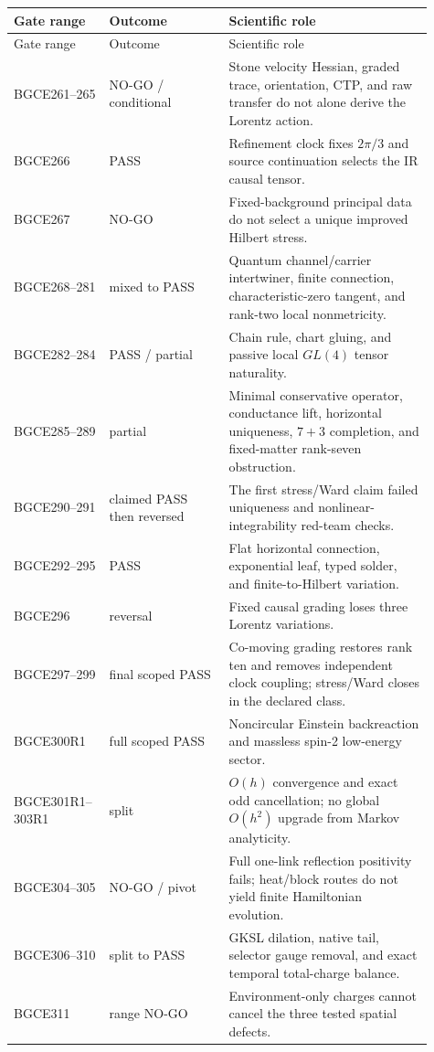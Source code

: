 \documentclass[11pt]{article}
\theoremstyle{definition}
\theoremstyle{remark}
\begin{document}
\begin{longtable}{>{\raggedright\arraybackslash}p{0.18\linewidth} >{\raggedright\arraybackslash}p{0.27\linewidth} >{\raggedright\arraybackslash}p{0.46\linewidth}}
\toprule
Gate range & Outcome & Scientific role \\
\midrule
\endfirsthead
\toprule
Gate range & Outcome & Scientific role \\
\midrule
\endhead
BGCE261--265 & NO-GO / conditional & Stone velocity Hessian, graded trace, orientation, CTP, and raw transfer do not alone derive the Lorentz action. \\
BGCE266 & PASS & Refinement clock fixes $2\pi/3$ and source continuation selects the IR causal tensor. \\
BGCE267 & NO-GO & Fixed-background principal data do not select a unique improved Hilbert stress. \\
BGCE268--281 & mixed to PASS & Quantum channel/carrier intertwiner, finite connection, characteristic-zero tangent, and rank-two local nonmetricity. \\
BGCE282--284 & PASS / partial & Chain rule, chart gluing, and passive local $GL(4)$ tensor naturality. \\
BGCE285--289 & partial & Minimal conservative operator, conductance lift, horizontal uniqueness, $7+3$ completion, and fixed-matter rank-seven obstruction. \\
BGCE290--291 & claimed PASS then reversed & The first stress/Ward claim failed uniqueness and nonlinear-integrability red-team checks. \\
BGCE292--295 & PASS & Flat horizontal connection, exponential leaf, typed solder, and finite-to-Hilbert variation. \\
BGCE296 & reversal & Fixed causal grading loses three Lorentz variations. \\
BGCE297--299 & final scoped PASS & Co-moving grading restores rank ten and removes independent clock coupling; stress/Ward closes in the declared class. \\
BGCE300R1 & full scoped PASS & Noncircular Einstein backreaction and massless spin-2 low-energy sector. \\
BGCE301R1--303R1 & split & $O(h)$ convergence and exact odd cancellation; no global $O(h^2)$ upgrade from Markov analyticity. \\
BGCE304--305 & NO-GO / pivot & Full one-link reflection positivity fails; heat/block routes do not yield finite Hamiltonian evolution. \\
BGCE306--310 & split to PASS & GKSL dilation, native tail, selector gauge removal, and exact temporal total-charge balance. \\
BGCE311 & range NO-GO & Environment-only charges cannot cancel the three tested spatial defects. \\
\bottomrule
\end{longtable}
\end{document}
